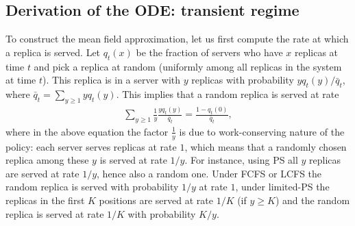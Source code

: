 \documentclass[acmsmall,nonacm]{acmart}
\begin{document}
\subsection{Derivation of the ODE: transient regime}
To construct the mean field approximation, let us first compute the rate at which a replica is served. Let $q_t(x)$ be the fraction of servers who have $x$ replicas at time $t$ and pick a replica at random (uniformly among all replicas in the system at time $t$). This replica is in a server with $y$ replicas with probability $y q_t(y)/\bar{q}_t$, where $\bar{q}_t = \sum_{y\ge1} yq_t(y)$. This implies that a random replica is served at rate 
\begin{align*}
    \sum_{y\ge1}\frac{1}{y} \frac{y q_t(y)}{\bar{q}_t} = \frac{1-q_t(0)}{\bar{q}_t},
\end{align*}
where in the above equation the factor $\frac{1}{y}$ is due to work-conserving nature of the policy: each server serves replicas at rate $1$, which means that a randomly chosen replica among these $y$ is served at rate $1/y$. For instance, using PS all $y$ replicas
are served at rate $1/y$, hence also a random one. Under FCFS or LCFS the random replica is served with probability $1/y$ at rate $1$, under limited-PS the replicas in the first $K$ positions are served at rate $1/K$ (if $y \geq K$) and the random replica is
served at rate $1/K$ with probability $K/y$. 
\end{document}
